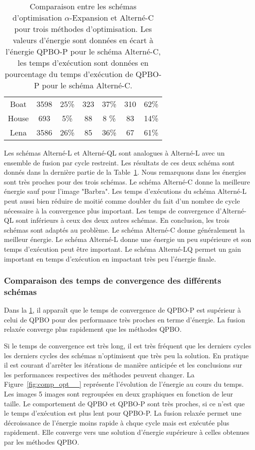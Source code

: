 \documentclass[../main/These_Mathias_Paget.tex]{subfiles}
\begin{document}
\begin{table}
\begin{tabular}{c|cc|cc|cc}
Boat & \num{3598} & 25\% &   \num{323 } & 37\%  &  \num{310 } & 62\%   \\
House & \num{693 } & 5\% &   \num{88  } & 8  \%   &  \num{83  } & 14\%   \\
Lena & \num{3586} & 26\% &   \num{85  } & 36\%  &  \num{67  } & 61\%   \\
\end{tabular}
\caption{Comparaison entre les schémas d'optimisation $\alpha$-Expansion et Alterné-C pour trois méthodes d'optimisation. Les valeurs d’énergie sont données en écart à l’énergie QPBO-P pour le schéma Alterné-C, les temps d’exécution sont données en pourcentage du temps d’exécution de QPBO-P pour le schéma Alterné-C.}
\label{tab:schema_comp}
\end{table}

	Les schémas Alterné-L et Alterné-QL sont analogues à Alterné-L avec un ensemble de fusion par cycle restreint. Les résultats de ces deux schéma sont donnés dans la dernière partie de la Table~\ref{tab:schema_comp}. Nous remarquons dans les énergies sont très proches pour des trois schémas. Le schéma Alterné-C donne la meilleure énergie sauf pour l'image "Barbra". Les temps d’exécutions du schéma Alterné-L peut aussi bien réduire de moitié comme doubler du fait d'un nombre de cycle nécessaire à la convergence plus important. Les temps de convergence d'Alterné-QL sont inférieurs à ceux des deux autres schémas. En conclusion, les trois schémas sont adaptés au problème. Le schéma Alterné-C donne généralement la meilleur énergie. Le schéma Alterné-L donne une énergie un peu supérieure et son temps d’exécution peut être important. Le schéma Alterné-LQ permet un gain important en temps d'exécution en impactant très peu l’énergie finale.

\subsubsection{Comparaison des temps de convergence des différents schémas}

Dans la \ref{tab:schema_comp}, il apparaît que le temps de convergence de QPBO-P est supérieur à celui de QPBO pour des performance très proches en terme d’énergie. La fusion relaxée converge plus rapidement  que les méthodes QPBO.

Si le temps de convergence est très long, il est très fréquent que les derniers cycles les derniers cycles des schémas n'optimisent que très peu la solution. En pratique il est courant d’arrêter les itérations de manière anticipée et les conclusions sur les performances respectives des méthodes peuvent changer. La Figure~\ref{fig:comp_opt__} représente l'évolution de l’énergie au cours du temps. Les images 5 images sont regroupées en deux graphiques en fonction de leur taille. Le comportement de QPBO et QPBO-P sont très proches, si ce n'est que le temps d’exécution est plus lent pour QPBO-P. La fusion relaxée permet une décroissance de l’énergie moins rapide à chque cycle mais est exécutée plus rapidement. Elle converge vers une solution d’énergie supérieure à celles obtenues par les méthodes QPBO.
\end{document}
